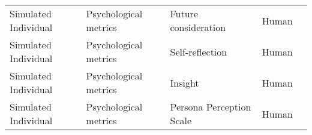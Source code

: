 \begin{small}
\begin{center}
\begin{longtable}{@{}p{}p{}p{}p{}p{}@{}}
Simulated Individual     & Psychological metrics & Future consideration                                                                                                                                                                                        & Human     & \cite{Pataranutaporn2024FutureYA}                                                                                                                                                                                                                                                                                                                                                                                                  \\
Simulated Individual     & Psychological metrics & Self-reflection                                                                                                                                                                                             & Human     & \cite{Pataranutaporn2024FutureYA}                                                                                                                                                                                                                                                                                                                                                                                                  \\
Simulated Individual     & Psychological metrics & Insight                                                                                                                                                                                                     & Human     & \cite{Pataranutaporn2024FutureYA}                                                                                                                                                                                                                                                                                                                                                                                                  \\
Simulated Individual     & Psychological metrics & Persona Perception Scale                                                                                                                                                                                    & Human     & \cite{Salminen2024PicturingTF}                                                                                                                                                                                                                                                                                                                                                                   \\

\end{longtable}
\end{center}
\end{small}
